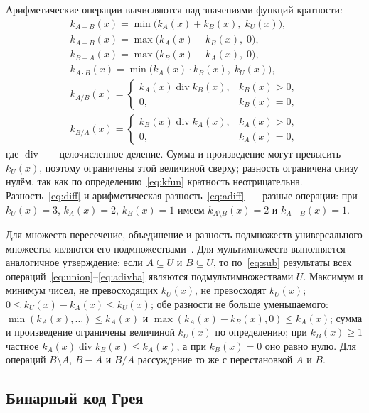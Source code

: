 \documentclass[14pt,a4paper]{extarticle}
\newcommand{\kA}{k_A(x)}
\newcommand{\kB}{k_B(x)}
\newcommand{\kU}{k_U(x)}
\begin{document}
Арифметические операции вычисляются над значениями функций кратности:
\begin{gather}
k_{A + B}(x) = \min\bigl(\kA + \kB,\; \kU\bigr), \label{eq:asum}\\
k_{A - B}(x) = \max\bigl(\kA - \kB,\; 0\bigr), \label{eq:adiff}\\
k_{B - A}(x) = \max\bigl(\kB - \kA,\; 0\bigr), \label{eq:adiffba}\\
k_{A \cdot B}(x) = \min\bigl(\kA \cdot \kB,\; \kU\bigr), \label{eq:aprod}\\
k_{A / B}(x) =
\begin{cases}
\kA \operatorname{div} \kB, & \kB > 0,\\
0, & \kB = 0,
\end{cases} \label{eq:adiv}\\
k_{B / A}(x) =
\begin{cases}
\kB \operatorname{div} \kA, & \kA > 0,\\
0, & \kA = 0,
\end{cases} \label{eq:adivba}
\end{gather}
где $\operatorname{div}$~--- целочисленное деление. Сумма и произведение могут превысить $\kU$, поэтому ограничены этой величиной сверху; разность ограничена снизу нулём, так как по определению~\eqref{eq:kfun} кратность неотрицательна. Разность~\eqref{eq:diff} и арифметическая разность~\eqref{eq:adiff}~--- разные операции: при $\kU = 3$, $\kA = 2$, $\kB = 1$ имеем $k_{A \setminus B}(x) = 2$ и $k_{A - B}(x) = 1$.

Для множеств пересечение, объединение и разность подмножеств универсального множества являются его подмножествами~\cite{novikov}. Для мультимножеств выполняется аналогичное утверждение: если $A \subseteq U$ и $B \subseteq U$, то по~\eqref{eq:sub} результаты всех операций~\eqref{eq:union}--\eqref{eq:adivba} являются подмультимножествами $U$. Максимум и минимум чисел, не превосходящих $\kU$, не превосходят $\kU$; $0 \leqslant \kU - \kA \leqslant \kU$; обе разности не больше уменьшаемого: $\min(\kA, \ldots) \leqslant \kA$ и $\max(\kA - \kB, 0) \leqslant \kA$; сумма и произведение ограничены величиной $\kU$ по определению; при $\kB \geqslant 1$ частное $\kA \operatorname{div} \kB \leqslant \kA$, а при $\kB = 0$ оно равно нулю. Для операций $B \setminus A$, $B - A$ и $B / A$ рассуждение то же с перестановкой $A$ и $B$.

\subsection{Бинарный код Грея}\label{sec:gray}
\end{document}
